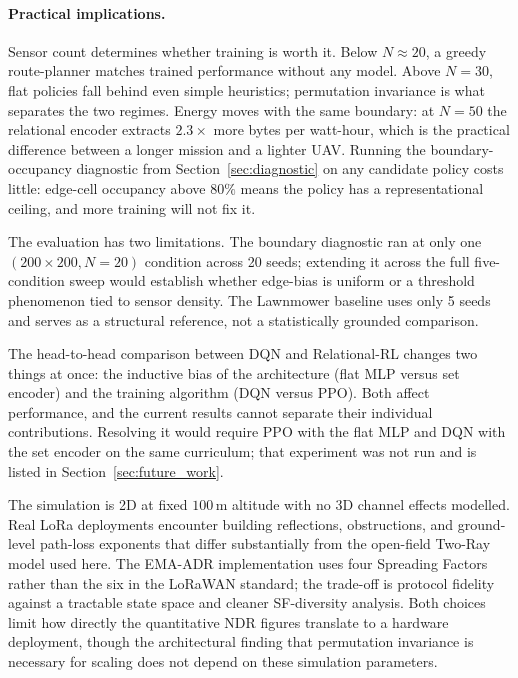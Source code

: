 \paragraph{Practical implications.}
Sensor count determines whether training is worth it. Below $N{\approx}20$, a greedy route-planner matches trained performance without any model. Above $N{=}30$, flat policies fall behind even simple heuristics; permutation invariance is what separates the two regimes. Energy moves with the same boundary: at $N{=}50$ the relational encoder extracts $2.3{\times}$ more bytes per watt-hour, which is the practical difference between a longer mission and a lighter UAV. Running the boundary-occupancy diagnostic from Section~\ref{sec:diagnostic} on any candidate policy costs little: edge-cell occupancy above $80\%$ means the policy has a representational ceiling, and more training will not fix it.

The evaluation has two limitations. The boundary diagnostic ran at only one $(200{\times}200, N{=}20)$ condition across 20 seeds; extending it across the full five-condition sweep would establish whether edge-bias is uniform or a threshold phenomenon tied to sensor density. The Lawnmower baseline uses only 5 seeds and serves as a structural reference, not a statistically grounded comparison.

The head-to-head comparison between DQN and Relational-RL changes two things at once: the inductive bias of the architecture (flat MLP versus set encoder) and the training algorithm (DQN versus PPO). Both affect performance, and the current results cannot separate their individual contributions. Resolving it would require PPO with the flat MLP and DQN with the set encoder on the same curriculum; that experiment was not run and is listed in Section~\ref{sec:future_work}.

The simulation is 2D at fixed $100$\,m altitude with no 3D channel effects modelled. Real LoRa deployments encounter building reflections, obstructions, and ground-level path-loss exponents that differ substantially from the open-field Two-Ray model used here. The EMA-ADR implementation uses four Spreading Factors rather than the six in the LoRaWAN standard; the trade-off is protocol fidelity against a tractable state space and cleaner SF-diversity analysis. Both choices limit how directly the quantitative NDR figures translate to a hardware deployment, though the architectural finding that permutation invariance is necessary for scaling does not depend on these simulation parameters.
